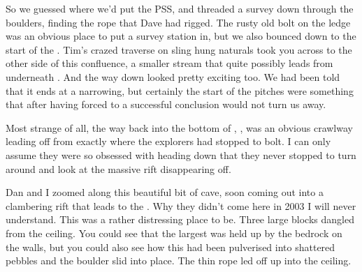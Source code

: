 So we guessed where we'd put the PSS, and threaded a survey down through
the boulders, finding the rope that Dave had rigged. The rusty old bolt
on the ledge was an obvious place to put a survey station in, but we
also bounced down to the start of the . Tim's crazed
traverse on sling hung naturals took you across to the other side of
this confluence, a smaller stream that quite possibly leads from
underneath . And the way down looked pretty
exciting too. We had been told that it ends at a narrowing, but
certainly the start of the pitches were something that after having
forced  to a successful conclusion would not turn
us away.

Most strange of all, the way back into the bottom of , , was an obvious crawlway leading off
from exactly where the  explorers had stopped to bolt.
I can only assume they were so obsessed with heading down that they
never stopped to turn around and look at the massive rift disappearing
off.

Dan and I zoomed along this beautiful bit of cave, soon coming out into
a clambering rift that leads to the . Why they
didn't come here in 2003 I will never understand. This was a rather
distressing place to be. Three large blocks dangled from the ceiling.
You could see that the largest was held up by the bedrock on the walls,
but you could also see how this had been pulverised into shattered
pebbles and the boulder slid into place. The thin rope led off up into
the ceiling.


